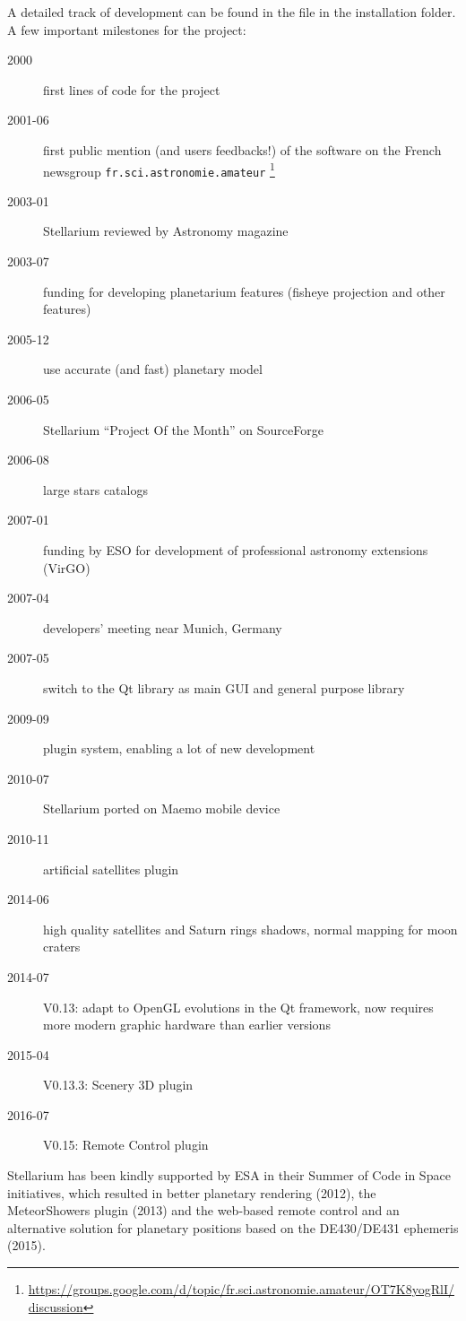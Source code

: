 \vspace{1\baselineskip}
\noindent A detailed track of development can be found in the
 file in the installation folder. A few important
milestones for the project:
\begin{description}
\item[2000] first lines of code for the project
\item[2001-06] first public mention (and users feedbacks!) of the
  software on the French newsgroup \texttt{fr.sci.astronomie.amateur} 
  \footnote{\url{https://groups.google.com/d/topic/fr.sci.astronomie.amateur/OT7K8yogRlI/discussion}}
\item[2003-01] Stellarium reviewed by Astronomy magazine
\item[2003-07] funding for developing planetarium features (fisheye projection and other features)
\item[2005-12] use accurate (and fast) planetary model
\item[2006-05] Stellarium ``Project Of the Month'' on SourceForge
\item[2006-08] large stars catalogs
\item[2007-01] funding by ESO for development of professional astronomy extensions (VirGO)
\item[2007-04] developers' meeting near Munich, Germany
\item[2007-05] switch to the Qt library as main GUI and general purpose library
\item[2009-09] plugin system, enabling a lot of new development
\item[2010-07] Stellarium ported on Maemo mobile device
\item[2010-11] artificial satellites plugin
\item[2014-06] high quality satellites and Saturn rings shadows, normal mapping for moon craters
\item[2014-07] V0.13: adapt to OpenGL evolutions in the Qt framework, now requires more modern graphic hardware than earlier versions
\item[2015-04] V0.13.3: Scenery 3D plugin
\item[2016-07] V0.15: Remote Control plugin
\end{description}

Stellarium has been kindly supported by ESA in their Summer of Code in
Space initiatives, which resulted in better planetary rendering
(2012), the MeteorShowers plugin (2013) and the web-based remote
control and an alternative solution for planetary positions based on
the DE430/DE431 ephemeris (2015).


